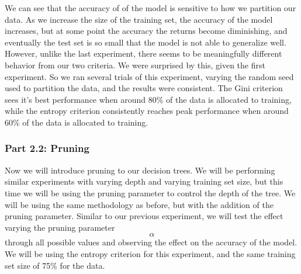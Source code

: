 \documentclass[
  letterpaper,
  DIV=11,
  numbers=noendperiod]{scrartcl}
\begin{document}
We can see that the accuracy of of the model is sensitive to how we
partition our data. As we increase the size of the training set, the
accuracy of the model increases, but at some point the accuracy the
returns become diminishing, and eventually the test set is so small that
the model is not able to generalize well. However, unlike the last
experiment, there seems to be meaningfully different behavior from our
two criteria. We were surprised by this, given the first experiment. So
we ran several trials of this experiment, varying the random seed used
to partition the data, and the results were consistent. The Gini
criterion sees it's best performance when around 80\% of the data is
allocated to training, while the entropy criterion consistently reaches
peak performance when around 60\% of the data is allocated to training.

\hypertarget{part-2.2-pruning}{%
\subsubsection{Part 2.2: Pruning}\label{part-2.2-pruning}}

Now we will introduce pruning to our decision trees. We will be
performing similar experiments with varying depth and varying training
set size, but this time we will be using the pruning parameter to
control the depth of the tree. We will be using the same methodology as
before, but with the addition of the pruning parameter. Similar to our
previous experiment, we will test the effect varying the pruning
parameter \[ \alpha \] through all possible values and observing the
effect on the accuracy of the model. We will be using the entropy
criterion for this experiment, and the same training set size of 75\%
for the data.
\end{document}
